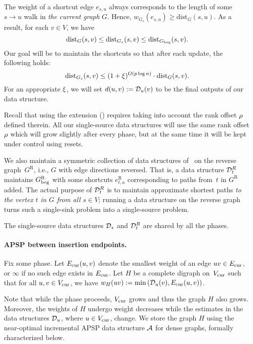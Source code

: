 \documentclass[11pt,letterpaper]{article}
\theoremstyle{plain}
\renewcommand{\O}{O}
\newcommand{\dist}{\mathrm{dist}}
\newcommand{\wei}{w}
\newcommand{\rev}[1]{#1^{\textrm{R}}}
\begin{document}
The weight of a shortcut edge $e_{s,u}$
always corresponds to the length of some $s\to u$ walk in \emph{the current graph} $G$.
Hence, $\wei_{G_s}(e_{s,u})\geq \dist_G(s,u)$.
As a result, for each $v\in V$, we have
\[ \dist_{G}(s,v)\leq \dist_{G_s}(s,v)\leq \dist_{\Gbeg}(s,v). \]
Our goal will be to maintain the shortcuts so that after each update, the following holds:
\[ \dist_{G_s}(s,v)\leq (1+\epsp)^{\O(p\log{n})}\cdot \dist_G(s,v). \]
For an appropriate $\xi$, we will set $d(u,v):=\mathcal{D}_u(v)$ to be the final outputs of our data structure.

Recall that using the extension () requires taking into account the rank offset $\rho$ defined therein.
All our single-source data structures will use the same rank offset $\rho$ which will grow slightly after every phase,
but at the same time it will be kept under control using resets.

We also maintain a symmetric collection of data structures of~ on the reverse
graph~$\rev{G}$, i.e., $G$ with edge directions reversed. That is, a data structure $\mathcal{D}^{R}_t$ maintains $\rev{\Gbeg}$ with some shortcuts $\rev{e_{t,u}}$
corresponding to paths from~$t$ in $\rev{G}$ added.
The actual purpose of $\mathcal{D}^{R}_t$ is to maintain approximate shortest paths \emph{to the vertex $t$ in $G$ from all $s\in V$};
running a data structure on the reverse graph turns such a single-sink problem into a single-source problem.

The single-source data structures $\mathcal{D}_s$ and $\mathcal{D}^{R}_t$ are shared by all the phases.


\paragraph{APSP between insertion endpoints.} Fix some phase.
Let $E_{\mathrm{cur}}(u,v)$ denote the smallest weight of an edge $uv\in E_{\mathrm{cur}}$, or $\infty$ if no such edge exists in $E_{\mathrm{cur}}$.
Let $H$ be a complete digraph on~$V_{\mathrm{cur}}$ such that
for all $u,v\in V_{\mathrm{cur}}$, we have $\wei_H(uv):=\min\left(\dsfrom_u(v),\Ecur(u,v)\right)$.

Note that while the phase proceeds, $V_{\mathrm{cur}}$ grows and thus the graph $H$ also grows.
Moreover, the weights of $H$ undergo weight decreases while the estimates
in the data structures $\mathcal{D}_u$, where $u\in V_{\mathrm{cur}}$, change.
We store the graph $H$ using the near-optimal incremental APSP data structure $\mathcal{A}$ for dense graphs, formally characterized below.
\end{document}
